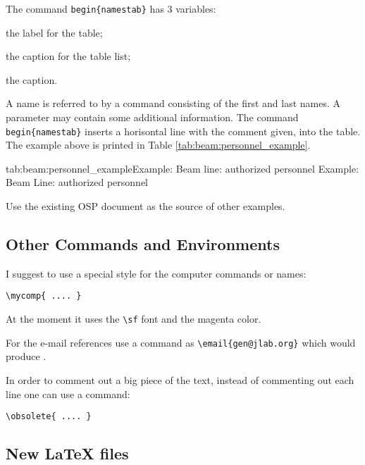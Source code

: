 \documentclass[12pt,letterpaper]{article}
\begin{document}
The command {{\color{blue}\verb|begin{namestab}|}} has 3 variables:
\begin{list}{.~}{\setlength{\itemsep}{-0.15cm}}
  \item the label for the table; 
  \item the caption for the table list;
  \item the caption.
\end{list}
A name is referred to by a command consisting of the first and last names.
A parameter may contain some additional information. The command
{{\color{blue}\verb|begin{namestab}|}} inserts a horisontal line 
with the comment given, into the table. The example above
is printed in Table \ref{tab:beam:personnel_example}.
\begin{namestab}{tab:beam:personnel_example}{Example: Beam line: authorized personnel}{%
   Example: Beam Line: authorized personnel}
\end{namestab}

Use the existing OSP document as the source of other examples.

\subsection{Other Commands and Environments}
\label{sec:otherenv}

  I suggest to use a special style for the computer
  commands or names:
  {\color{blue}
   \begin{verbatim}
\mycomp{ .... }
  \end{verbatim}%
  }\noindent
  At the moment it uses the {\color{blue}\verb|\sf|} font
  and the magenta color.

  For the e-mail references use a command as {\color{blue}\verb|\email{gen@jlab.org}|}
  which would produce .

  In order to comment out a big piece of the text, instead
  of commenting out each line one can use 
  a command:
  {\color{blue}
   \begin{verbatim}
\obsolete{ .... }
  \end{verbatim}%
  }\noindent

\subsection{New \LaTeX{} files}
\label{sec:newlatex}
\end{document}
